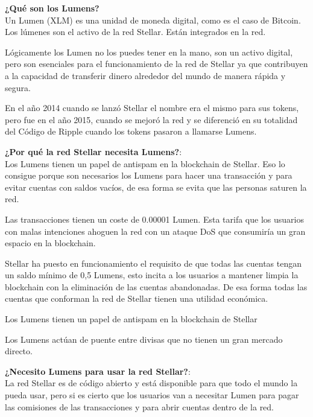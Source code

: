 \documentclass[a4paper,12pt]{/home/armando/Documentos/Cursos/LaTeX/Plantillas/lib/pub}
\begin{document}
	\textbf{¿Qué son los Lumens?}\\
	Un Lumen (XLM) es una unidad de moneda digital, como es el caso de Bitcoin. Los lúmenes son el activo de la red Stellar. Están integrados en la red.
	
	Lógicamente los Lumen no los puedes tener en la mano, son un activo digital, pero son esenciales para el funcionamiento de la red de Stellar ya que contribuyen a la capacidad de transferir dinero alrededor del mundo de manera rápida y segura.
	
	En el año 2014 cuando se lanzó Stellar el nombre era el mismo para sus tokens, pero fue en el año 2015, cuando se mejoró la red y se diferenció en su totalidad del Código de Ripple cuando los tokens pasaron a llamarse Lumens.
	
	\textbf{¿Por qué la red Stellar necesita Lumens?}:\\
	Los Lumens tienen un papel de antispam en la blockchain de Stellar. Eso lo consigue porque son necesarios los Lumens para hacer una transacción y para evitar cuentas con saldos vacíos, de esa forma se evita que las personas saturen la red.
	
	Las transacciones tienen un coste de 0.00001 Lumen. Esta tarifa que los usuarios con malas intenciones ahoguen la red con un ataque DoS que consumiría un gran espacio en la blockchain.
	
	Stellar ha puesto en funcionamiento el requisito de que todas las cuentas tengan un saldo mínimo de 0,5 Lumens, esto incita a los usuarios a mantener limpia la blockchain con la eliminación de las cuentas abandonadas. De esa forma todas las cuentas que conforman la red de Stellar tienen una utilidad económica.
	
	Los Lumens tienen un papel de antispam en la blockchain de Stellar
	
	Los Lumens actúan de puente entre divisas que no tienen un gran mercado directo.
	
	\textbf{¿Necesito Lumens para usar la red Stellar?}:\\
	La red Stellar es de código abierto y está disponible para que todo el mundo la pueda usar, pero si es cierto que los usuarios van a necesitar Lumen para pagar las comisiones de las transacciones y para abrir cuentas dentro de la red.
	
\end{document}
